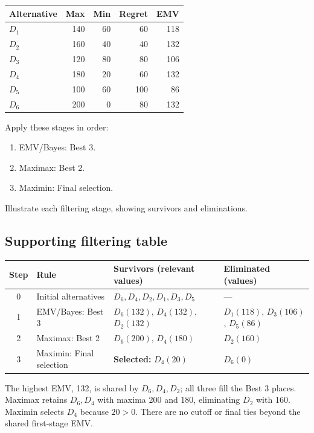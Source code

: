 \vspace{-3mm}
\begin{center}\small\setlength{\tabcolsep}{4pt}
	\begin{tabular}{lrrrr}\toprule
		Alternative & Max & Min & Regret & EMV\\ \midrule
		$D_1$ & 140 & 60 & 60 & 118\\
		$D_2$ & 160 & 40 & 40 & 132\\
		$D_3$ & 120 & 80 & 80 & 106\\
		$D_4$ & 180 & 20 & 60 & 132\\
		$D_5$ & 100 & 60 & 100 & 86\\
		$D_6$ & 200 & 0 & 80 & 132\\
		\bottomrule
	\end{tabular}
\end{center}
\vspace{-3mm}

Apply these stages in order:
\begin{enumerate}[leftmargin=*]
	\item EMV/Bayes: Best 3.
	\item Maximax: Best 2.
	\item Maximin: Final selection.
\end{enumerate}
Illustrate each filtering stage, showing survivors and eliminations.
\label{sol:q3table}
\subsection*{Supporting filtering table}
\begin{center}\small
\begin{tabularx}{\textwidth}{@{}c >{\raggedright\arraybackslash}p{} >{\raggedright\arraybackslash}X >{\raggedright\arraybackslash}p{}@{}}
\toprule
Step & Rule & Survivors (relevant values) & Eliminated (values)\\\midrule
0 & Initial alternatives & $D_6,D_4,D_2,D_1,D_3,D_5$ & ---\\
1 & EMV/Bayes: Best 3 & $D_6(132)$, $D_4(132)$, $D_2(132)$ & $D_1(118)$, $D_3(106)$, $D_5(86)$\\
2 & Maximax: Best 2 & $D_6(200)$, $D_4(180)$ & $D_2(160)$\\
3 & Maximin: Final selection & \textbf{Selected:} $D_4(20)$ & $D_6(0)$\\
\bottomrule\end{tabularx}
\end{center}
The highest EMV, 132, is shared by $D_6,D_4,D_2$; all three fill the Best 3 places. Maximax retains $D_6,D_4$ with maxima 200 and 180, eliminating $D_2$ with 160. Maximin selects $D_4$ because $20>0$. There are no cutoff or final ties beyond the shared first-stage EMV.
\secInicio[sec:q3]
\clearpage
{}\label{sol:q3tree}
